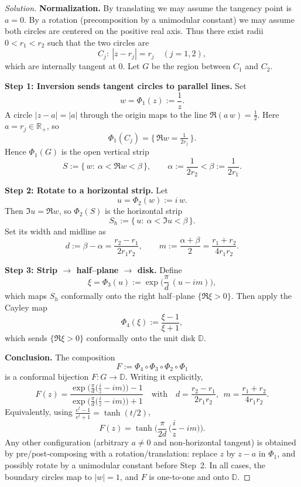 \documentclass[12pt, a4paper]{report}
\theoremstyle{spaced}
\begin{document}
\begin{proof}[Solution]
	\textbf{Normalization.}
	By translating we may assume the tangency point is \(a=0\). By a rotation
	(precomposition by a unimodular constant) we may assume both circles are
	centered on the positive real axis. Thus there exist radii
	\(0<r_1<r_2\) such that the two circles are
	\[
		C_j:\ |z-r_j|=r_j\quad(j=1,2),
	\]
	which are internally tangent at \(0\). Let \(G\) be the region between
	\(C_1\) and \(C_2\).

	\medskip
	\textbf{Step 1: Inversion sends tangent circles to parallel lines.}
	Set
	\[
		w=\Phi_1(z):=\frac{1}{z}.
	\]
	A circle \(|z-a|=|a|\) through the origin maps to the line
	\(\Re(a\,w)=\tfrac12\). Here \(a=r_j\in\mathbb{R}_+\), so
	\[
		\Phi_1(C_j)=\{\,\Re w=\tfrac{1}{2r_j}\,\}.
	\]
	Hence \(\Phi_1(G)\) is the open vertical strip
	\[
		S:=\Big\{\,w:\ \alpha<\Re w<\beta\,\Big\},\qquad
		\alpha:=\frac{1}{2r_2}<\beta:=\frac{1}{2r_1}.
	\]

	\medskip
	\textbf{Step 2: Rotate to a horizontal strip.}
	Let
	\[
		u=\Phi_2(w):=i\,w.
	\]
	Then \(\Im u=\Re w\), so \(\Phi_2(S)\) is the horizontal strip
	\[
		S_h:=\{\,u:\ \alpha<\Im u<\beta\,\}.
	\]
	Set its width and midline as
	\[
		d:=\beta-\alpha=\frac{r_2-r_1}{2r_1r_2},\qquad
		m:=\frac{\alpha+\beta}{2}=\frac{r_1+r_2}{4r_1r_2}.
	\]

	\medskip
	\textbf{Step 3: Strip \(\to\) half--plane \(\to\) disk.}
	Define
	\[
		\xi=\Phi_3(u):=\exp\!\Big(\frac{\pi}{d}\,(u-i m)\Big),
	\]
	which maps \(S_h\) conformally onto the right half--plane \(\{\Re \xi>0\}\).
	Then apply the Cayley map
	\[
		\Phi_4(\xi):=\frac{\xi-1}{\xi+1},
	\]
	which sends \(\{\Re \xi>0\}\) conformally onto the unit disk \(\mathbb{D}\).

	\medskip
	\textbf{Conclusion.}
	The composition
	\[
		F:=\Phi_4\circ\Phi_3\circ\Phi_2\circ\Phi_1
	\]
	is a conformal bijection \(F:G\to\mathbb{D}\). Writing it explicitly,
	\[
		F(z)=\frac{\exp\!\Big(\frac{\pi}{d}\big(\frac{i}{z}-i m\big)\Big)-1}
		{\exp\!\Big(\frac{\pi}{d}\big(\frac{i}{z}-i m\big)\Big)+1}
		\quad\text{with}\quad
		d=\frac{r_2-r_1}{2r_1r_2},\ \ m=\frac{r_1+r_2}{4r_1r_2}.
	\]
	Equivalently, using \(\frac{e^t-1}{e^t+1}=\tanh(t/2)\),
	\[
		F(z)=\tanh\!\Big(\frac{\pi}{2d}\,\Big(\frac{i}{z}-i m\Big)\Big).
	\]
	Any other configuration (arbitrary \(a\neq0\) and non‐horizontal tangent)
	is obtained by pre/post‐composing with a rotation/translation:
	replace \(z\) by \(z-a\) in \(\Phi_1\), and possibly rotate by a unimodular
	constant before Step~2. In all cases, the boundary circles map to \(|w|=1\),
	and \(F\) is one-to-one and onto \(\mathbb{D}\).
	\qedhere
\end{proof}
\newpage
\end{document}
